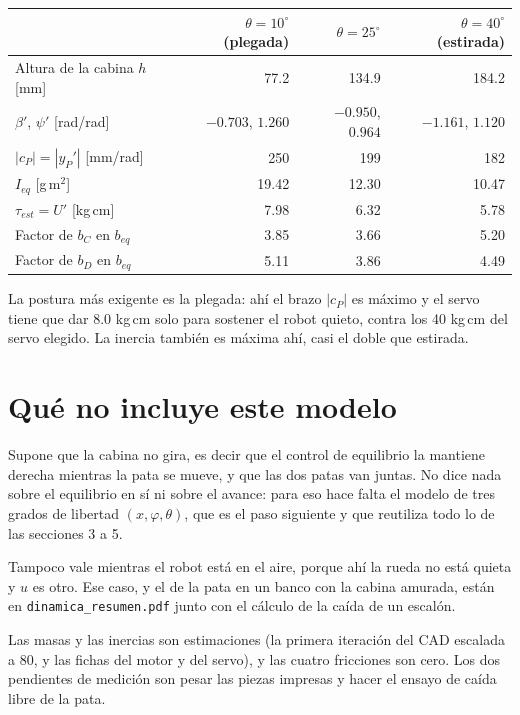 \documentclass[11pt,a4paper]{article}
\begin{document}
\begin{center}\small
\begin{tabular}{lrrr}
\toprule
 & \(\theta=10^\circ\) (plegada) & \(\theta=25^\circ\) & \(\theta=40^\circ\) (estirada) \\
\midrule
Altura de la cabina \(h\) [mm] & 77.2 & 134.9 & 184.2 \\
\(\beta'\), \(\psi'\) [rad/rad] & \(-0.703\), \(1.260\) & \(-0.950\), \(0.964\) & \(-1.161\), \(1.120\) \\
\(|c_P|=|y_P'|\) [mm/rad] & 250 & 199 & 182 \\
\(I_{eq}\) [g\,m\(^2\)] & 19.42 & 12.30 & 10.47 \\
\(\tau_{est}=U'\) [kg\,cm] & 7.98 & 6.32 & 5.78 \\
\midrule
Factor de \(b_C\) en \(b_{eq}\) & 3.85 & 3.66 & 5.20 \\
Factor de \(b_D\) en \(b_{eq}\) & 5.11 & 3.86 & 4.49 \\
\bottomrule
\end{tabular}
\end{center}

La postura más exigente es la plegada: ahí el brazo \(|c_P|\) es máximo y el servo tiene que dar 8.0 kg\,cm
solo para sostener el robot quieto, contra los 40 kg\,cm del servo elegido. La inercia también es máxima ahí, casi
el doble que estirada.

\section{Qué no incluye este modelo}

Supone que la cabina no gira, es decir que el control de equilibrio la mantiene derecha mientras la pata se
mueve, y que las dos patas van juntas. No dice nada sobre el equilibrio en sí ni sobre el avance: para eso
hace falta el modelo de tres grados de libertad \((x,\varphi,\theta)\), que es el paso siguiente y que
reutiliza todo lo de las secciones 3 a 5.

Tampoco vale mientras el robot está en el aire, porque ahí la rueda no está quieta y \(u\) es otro. Ese caso,
y el de la pata en un banco con la cabina amurada, están en \texttt{dinamica\_resumen.pdf} junto con el
cálculo de la caída de un escalón.

Las masas y las inercias son estimaciones (la primera iteración del CAD escalada a 80, y las fichas del motor y del servo), y las cuatro fricciones son cero. Los dos pendientes de
medición son pesar las piezas impresas y hacer el ensayo de caída libre de la pata.
\end{document}
